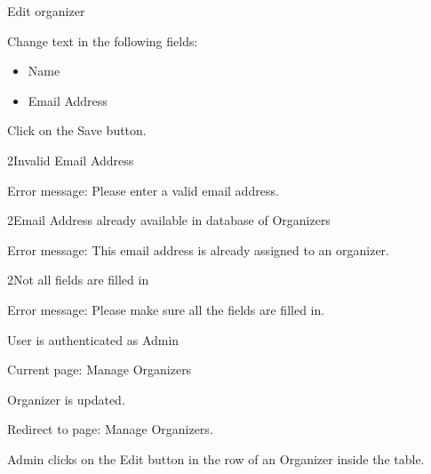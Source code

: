 
\begin{uc}{Edit organizer}


    \begin{uc-mss}
    \item Change text in the following fields:
        \begin{itemize}
			\item Name
			\item Email Address
			\end{itemize}
    \item Click on the Save button.
    \end{uc-mss}

    \begin{uc-ext}

        \begin{uc-fail}{2}{Invalid Email Address}
        \item Error message: Please enter a valid email address.
        \end{uc-fail}

        \begin{uc-fail}{2}{Email Address already available in database of Organizers }
        \item Error message: This email address is already assigned to an organizer.
        \end{uc-fail}

        \begin{uc-fail}{2}{Not all fields are filled in}
        \item Error message: Please make sure all the fields are filled in.
        \end{uc-fail}

    \end{uc-ext}

    \begin{uc-pre}
    \item User is authenticated as Admin
    \item Current page: Manage Organizers
    \end{uc-pre}

    \begin{uc-post}
    \item Organizer is updated.
    \item Redirect to page: Manage Organizers.
    \end{uc-post}

    \begin{uc-trig}
        Admin clicks on the Edit button in the row of an Organizer inside the
        table.
    \end{uc-trig}

\end{uc}
